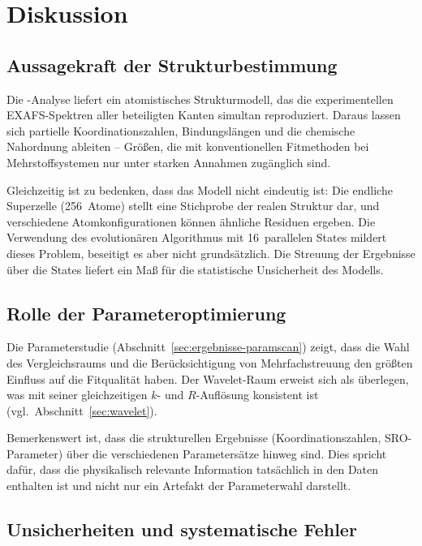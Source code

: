 \chapter{Diskussion}
\label{ch:diskussion}

\section{Aussagekraft der Strukturbestimmung}

Die \evax{}-Analyse liefert ein atomistisches Strukturmodell, das die
experimentellen EXAFS-Spektren aller beteiligten Kanten simultan
reproduziert.
Daraus lassen sich partielle Koordinationszahlen, Bindungslängen und
die chemische Nahordnung ableiten -- Größen, die mit konventionellen
Fitmethoden bei Mehrstoffsystemen nur unter starken Annahmen
zugänglich sind.

Gleichzeitig ist zu bedenken, dass das Modell nicht eindeutig ist:
Die endliche Superzelle (256~Atome) stellt eine Stichprobe der
realen Struktur dar, und verschiedene Atomkonfigurationen können
ähnliche Residuen ergeben.
Die Verwendung des evolutionären Algorithmus mit 16~parallelen States
mildert dieses Problem, beseitigt es aber nicht grundsätzlich.
Die Streuung der Ergebnisse über die States liefert ein Maß für die
statistische Unsicherheit des Modells.

\section{Rolle der Parameteroptimierung}

Die Parameterstudie (Abschnitt~\ref{sec:ergebnisse-paramscan}) zeigt,
dass die Wahl des Vergleichsraums und die Berücksichtigung von
Mehrfachstreuung den größten Einfluss auf die Fitqualität haben.
Der Wavelet-Raum erweist sich als überlegen, was mit seiner
gleichzeitigen $k$- und $R$-Auflösung konsistent ist
(vgl.\ Abschnitt~\ref{sec:wavelet}).

Bemerkenswert ist, dass die strukturellen Ergebnisse
(Koordinationszahlen, SRO-Parameter) über die verschiedenen
Parametersätze hinweg  sind.
Dies spricht dafür, dass die physikalisch relevante Information
tatsächlich in den Daten enthalten ist und nicht nur ein Artefakt der
Parameterwahl darstellt.

\section{Unsicherheiten und systematische Fehler}

